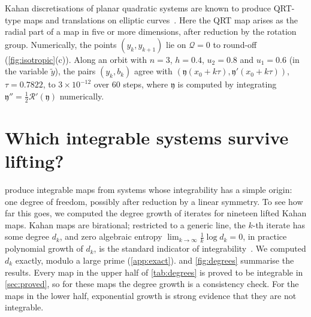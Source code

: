 \documentclass[11pt,a4paper]{article}
\theoremstyle{definition}
\theoremstyle{remark}
\begin{document}
Kahan discretisations of planar quadratic systems are known to produce QRT-type maps and translations on
elliptic curves~\cite{PSS19,GMQ24}. Here the QRT map arises as the radial part of a map in five or more
dimensions, after reduction by the rotation group. Numerically, the points $(y_k,y_{k+1})$ lie on $\mathcal Q=0$
to round-off (\cref{fig:isotropic}(c)). Along an orbit with $n=3$, $h=0.4$, $u_2=0.8$ and $u_1=0.6$ (in the
variable $\tilde y$), the pairs $(y_k,b_k)$ agree with $(\mathfrak y(x_0+k\tau),\mathfrak y'(x_0+k\tau))$,
$\tau=0.7822$, to $3\times10^{-12}$ over 60 steps, where $\mathfrak y$ is computed by integrating
$\mathfrak y''=\frac12\mathcal R'(\mathfrak y)$ numerically.

\section{Which integrable systems survive lifting?}\label{sec:survey}

 produce integrable maps from systems whose integrability has a simple
origin: one degree of freedom, possibly after reduction by a linear symmetry. To see how far this goes, we
computed the degree growth of iterates for nineteen lifted Kahan maps. Kahan maps are birational; restricted
to a generic line, the $k$-th iterate has some degree $d_k$, and zero algebraic entropy
$\lim_{k\to\infty}\frac1k\log d_k=0$, in practice polynomial growth of $d_k$, is the standard indicator of
integrability~\cite{HietarintaViallet98,BellonViallet99}. We computed $d_k$ exactly, modulo a large prime
(\cref{app:exact}).  and \cref{fig:degrees} summarise the results. Every map in the upper half
of \cref{tab:degrees} is proved to be integrable in \cref{sec:proved}, so for these maps the degree growth is a
consistency check. For the maps in the lower half, exponential growth is strong evidence that they are not
integrable.
\end{document}
